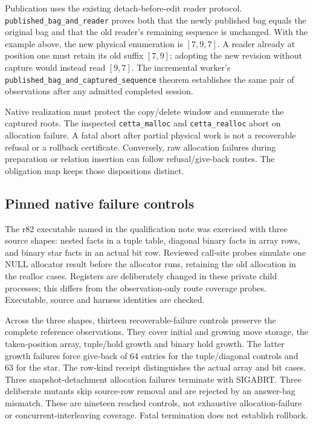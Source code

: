 \documentclass[11pt,a4paper]{article}
\newcommand{\code}[1]{\nolinkurl{#1}}
\begin{document}
Publication uses the existing detach-before-edit reader protocol.
\code{published_bag_and_reader} proves both that the newly published bag
equals the original bag and that the old reader's remaining sequence is
unchanged. With the example above, the new physical enumeration is
$[7,9,7]$. A reader already at position one must retain its old suffix
$[7,9]$; adopting the new revision without capture would instead read
$[9,7]$.
The incremental worker's \code{published_bag_and_captured_sequence} theorem
establishes the same pair of observations after any admitted completed session.

Native realization must protect the copy/delete window and enumerate the
captured roots. The inspected \code{cetta_malloc} and \code{cetta_realloc}
abort on allocation failure. A fatal abort after partial physical work is
not a recoverable refusal or a rollback certificate. Conversely, raw
allocation failures during preparation or relation insertion can follow
refusal/give-back routes. The obligation map keeps those dispositions distinct.

\subsection{Pinned native failure controls}

The r82 executable named in the qualification note was exercised with three
source shapes: nested facts in a tuple table, diagonal binary facts in array
rows, and binary star facts in an actual bit row. Reviewed call-site probes
simulate one NULL allocator result before the allocator runs, retaining the
old allocation in the realloc cases. Registers are deliberately changed in
these private child processes; this differs from the observation-only route
coverage probes. Executable, source and harness identities are checked.

Across the three shapes, thirteen recoverable-failure controls preserve the
complete reference observations. They cover initial and growing move storage,
the taken-position array, tuple/hold growth and binary hold growth. The latter
growth failures force give-back of 64 entries for the tuple/diagonal controls
and 63 for the star. The row-kind receipt distinguishes the actual array and
bit cases. Three snapshot-detachment allocation failures terminate with
SIGABRT. Three deliberate mutants skip source-row removal and are rejected
by an answer-bag mismatch. These are nineteen reached controls, not exhaustive
allocation-failure or concurrent-interleaving coverage. Fatal termination
does not establish rollback.
\end{document}
